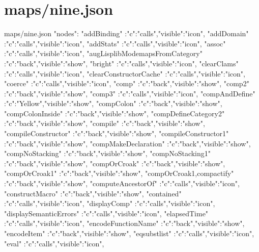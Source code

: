 \documentclass{article}
\begin{document}
\section{maps/nine.json}
\begin{chunk}{maps/nine.json}
{"nodes":
 {
  "addBinding"                     :{"c":"calls","visible":"icon"},
  "addDomain"                      :{"c":"calls","visible":"icon"},
  "addStats"                       :{"c":"calls","visible":"icon"},
  "assoc"                          :{"c":"calls","visible":"icon"},
  "augLisplibModemapsFromCategory" :{"c":"back","visible":"show"},
  "bright"                         :{"c":"calls","visible":"icon"},
  "clearClams"                     :{"c":"calls","visible":"icon"},
  "clearConstructorCache"          :{"c":"calls","visible":"icon"},
  "coerce"                         :{"c":"calls","visible":"icon"},
  "comp"                           :{"c":"back","visible":"show"},
  "comp2"                          :{"c":"back","visible":"show"},
  "comp3"                          :{"c":"calls","visible":"icon"},
  "compAndDefine"                  :{"c":"Yellow","visible":"show"},
  "compColon"                      :{"c":"back","visible":"show"},
  "compColonInside"                :{"c":"back","visible":"show"},
  "compDefineCategory2"            :{"c":"back","visible":"show"},
  "compile"                        :{"c":"back","visible":"show"},
  "compileConstructor"             :{"c":"back","visible":"show"},
  "compileConstructor1"            :{"c":"back","visible":"show"},
  "compMakeDeclaration"            :{"c":"back","visible":"show"},
  "compNoStacking"                 :{"c":"back","visible":"show"},
  "compNoStacking1"                :{"c":"back","visible":"show"},
  "compOrCroak"                    :{"c":"back","visible":"show"},
  "compOrCroak1"                   :{"c":"back","visible":"show"},
  "compOrCroak1,compactify"        :{"c":"back","visible":"show"},
  "computeAncestorOf"              :{"c":"calls","visible":"icon"},
  "constructMacro"                 :{"c":"back","visible":"show"},
  "contained"                      :{"c":"calls","visible":"icon"},
  "displayComp"                    :{"c":"calls","visible":"icon"},
  "displaySemanticErrors"          :{"c":"calls","visible":"icon"},
  "elapsedTime"                    :{"c":"calls","visible":"icon"},
  "encodeFunctionName"             :{"c":"back","visible":"show"},
  "encodeItem"                     :{"c":"back","visible":"show"},
  "eqsubstlist"                    :{"c":"calls","visible":"icon"},
  "eval"                           :{"c":"calls","visible":"icon"},
}}
\end{chunk}
\end{document}
